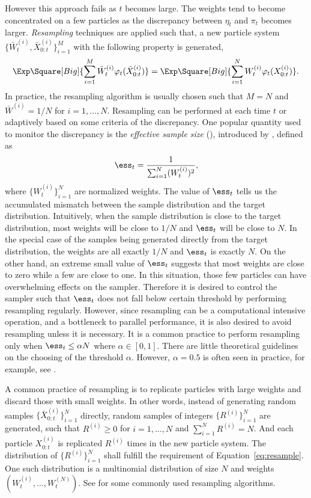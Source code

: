 \documentclass[11pt, bib, hyper, mint, minted=cache]{marticle}
\begin{document}
However this approach fails as $t$ becomes large. The weights tend to become
concentrated on a few particles as the discrepancy between $\eta_t$ and
$\pi_t$ becomes larger. \emph{Resampling} techniques are applied such that, a
new particle system $\{\bar{W}_t^{(i)},\bar{X}_{0:t}^{(i)}\}_{i=1}^M$ with the
following property is generated,
\begin{equation}
  \Exp\Square[Big]{\sum_{i=1}^M\bar{W}_t^{(i)}\varphi_t(\bar{X}_{0:t}^{(i)})}
  = \Exp\Square[Big]{\sum_{i=1}^NW_t^{(i)}\varphi_t(X_{0:t}^{(i)})}.
  \label{eq:resample}
\end{equation}
In practice, the resampling algorithm is usually chosen such that $M = N$ and
$\bar{W}^{(i)} = 1/N$ for $i=1,\dots,N$. Resampling can be performed at each
time $t$ or adaptively based on some criteria of the discrepancy. One popular
quantity used to monitor the discrepancy is the \emph{effective sample size}
(\ess), introduced by \textcite{Liu:1998iu}, defined as
\begin{equation}
  \ess_t = \frac{1}{\sum_{i=1}^N (W_t^{(i)})^2},
\end{equation}
where $\{W_t^{(i)}\}_{i=1}^N$ are normalized weights. The value of $\ess_t$
tells us the accumulated mismatch between the sample distribution and the
target distribution. Intuitively, when the sample distribution is close to the
target distribution, most weights will be close to $1/N$ and $\ess_t$ will be
close to $N$. In the special case of the samples being generated directly from
the target distribution, the weights are all exactly $1/N$ and $\ess_t$ is
exactly $N$. On the other hand, an extreme small value of $\ess_t$ suggests
that most weights are close to zero while a few are close to one. In this
situation, those few particles can have overwhelming effects on the sampler.
Therefore it is desired to control the sampler such that $\ess_t$ does not
fall below certain threshold by performing resampling regularly. However,
since resampling can be a computational intensive operation, and a bottleneck
to parallel performance, it is also desired to avoid resampling unless it is
necessary. It is a common practice to perform resampling only when $\ess_t\le
\alpha N$ where $\alpha\in[0,1]$. There are little theoretical guidelines on
the choosing of the threshold $\alpha$. However, $\alpha = 0.5$ is often seen
in practice, for example, see \textcite{Jasra:2010eh}.

A common practice of resampling is to replicate particles with large weights
and discard those with small weights. In other words, instead of generating
random samples $\{\bar{X}_{0:t}^{(i)}\}_{i=1}^N$ directly, random samples of
integers $\{R^{(i)}\}_{i=1}^N$ are generated, such that $R^{(i)} \ge 0$ for $i
= 1,\dots,N$ and $\sum_{i=1}^N R^{(i)} = N$. And each particle $X_{0:t}^{(i)}$
is replicated $R^{(i)}$ times in the new particle system. The distribution of
$\{R^{(i)}\}_{i=1}^N$ shall fulfill the requirement of
Equation~\ref{eq:resample}. One such distribution is a multinomial
distribution of size $N$ and weights $(W_t^{(i)},\dots,W_t^{(N)})$. See
\textcite{Douc:2005wa} for some commonly used resampling algorithms.
\end{document}
